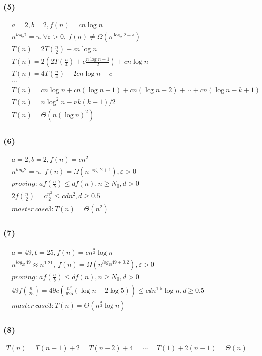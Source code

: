 \documentclass[11pt]{ctexart}
\begin{document}
	\subsubsection*{(5)}
	$\begin{aligned}
	&a=2,b=2,f(n)=cn\log n\\
	&n^{log_2 2}=n,\forall \varepsilon >0,\ f(n)\neq\Omega(n^{\log_2 2+\varepsilon})\\
	&T(n)=2T(\frac{n}{2})+cn\log n\\
	&T(n)=2(2T(\frac{n}{4})+c\frac{n\log n -1}{2})+cn\log n\\
	&T(n)=4T(\frac{n}{4})+2cn\log n-c\\
	&\cdots\\
	&T(n)=cn\log n+cn(\log n-1)+cn(\log n-2)+\cdots+cn(\log n-k+1)\\
	&T(n)=n\log^2n-nk(k-1)/2\\
	&T(n)=\Theta(n(\log n)^2)
	\end{aligned}
	$
	\subsubsection*{(6)}
	$\begin{aligned}
	&a=2,b=2,f(n)=cn^2\\
	&n^{log_2 2}=n,\ f(n)=\Omega(n^{\log_2 2+1}),\varepsilon >0 \\
	&proving:\ af(\frac{n}{b})\leq df(n), n\geq N_0,d>0\\
	&2f(\frac{n}{2})=c\frac{n^2}{2}\leq cdn^2,d\geq0.5\\
	&master\ case3:T(n)=\Theta (n^2)
	\end{aligned}
	$
	\subsubsection*{(7)}
	$\begin{aligned}
	&a=49,b=25,f(n)=cn^{\frac{3}{2}}\log n\\
	&n^{log_{25}49}\approx n^{1.21},\ f(n)=\Omega(n^{log_{25}49+0.2}),\varepsilon >0 \\
	&proving:\ af(\frac{n}{b})\leq df(n), n\geq N_0,d>0\\
	&49f(\frac{n}{25})=49c(\frac{n^2}{625}(\log n-2\log 5))\leq cdn^{1.5}\log n,d\geq0.5\\
	&master\ case3:T(n)=\Theta (n^{\frac{3}{2}}\log n)
	\end{aligned}
	$
	\subsubsection*{(8)}
	$\begin{aligned}
	T(n)
	=T(n-1)+2
	=T(n-2)+4
	=\cdots
	=T(1)+2(n-1)
	=\Theta (n)
	\end{aligned}
	$
\end{document}
